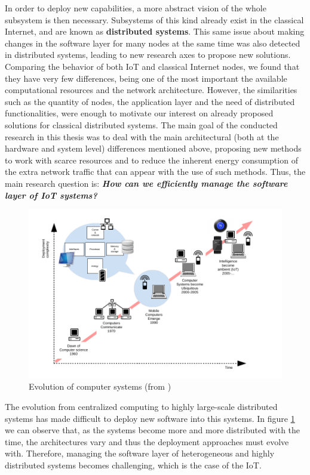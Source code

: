 In order to deploy new capabilities, a more abstract vision of the whole subsystem is then necessary.
Subsystems of this kind already exist in the classical Internet, and are known as \textbf{distributed systems}\cite{coulouris2005distributed}.
This same issue about making changes in the software layer for many nodes at the same time was also detected in distributed systems, leading to new research axes to propose new solutions.
Comparing the behavior of both IoT and classical Internet nodes, we found that they have very few differences, being one of the most important the available computational resources and the network architecture.
However, the similarities such as the quantity of nodes, the application layer and the need of distributed functionalities, were enough to motivate our interest on already proposed solutions for classical distributed systems.
The main goal of the conducted research in this thesis was to deal with the main architectural (both at the hardware and system level) differences mentioned above, proposing new methods to work with scarce resources and to reduce the inherent energy consumption of the extra network traffic that can appear with the use of such methods.
Thus, the main research question is: \textit{\textbf{How can we efficiently manage the software layer of IoT systems?}}

\begin{figure}[htb]
	\centering
	\includegraphics[width=1\columnwidth]{chapters/background.images/evolutionCompSys.pdf}
	\caption{Evolution of computer systems (from \cite{waldner2007nano})}
	\label{fig:EvolCompSyst}
\end{figure}

The evolution from centralized computing to highly large-scale distributed systems has made difficult to deploy new software into this systems.
In figure \ref{fig:EvolCompSyst} we can observe that, as the systems become more and more distributed with the time, the architectures vary and thus the deployment approaches must evolve with.
Therefore, managing the software layer of heterogeneous and highly distributed systems becomes challenging, which is the case of the IoT.

